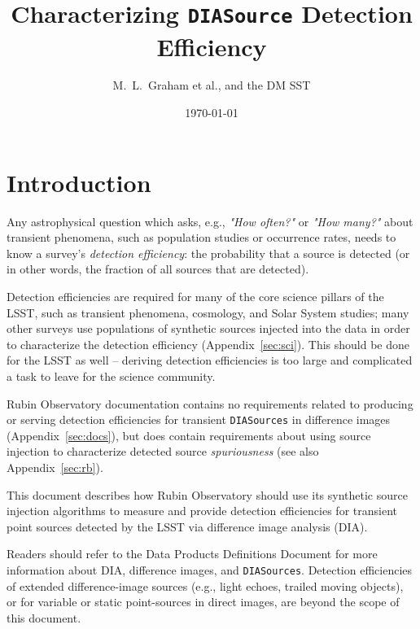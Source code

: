 \documentclass[DM,lsstdraft,toc]{lsstdoc}
\title[Detection Efficiencies]{Characterizing {\tt DIASource} Detection Efficiency}
\author{M.~L.~Graham et al., and the DM SST}
\date{\today}
\begin{document}
\maketitle



\section{Introduction} \label{sec:intro}

Any astrophysical question which asks, e.g., {\it "How often?"} or {\it "How many?"} about transient phenomena, such as population studies or occurrence rates, needs to know a survey's {\it detection efficiency}: the probability that a source is detected (or in other words, the fraction of all sources that are detected).

Detection efficiencies are required for many of the core science pillars of the LSST, such as transient phenomena, cosmology, and Solar System studies; many other surveys use populations of synthetic sources injected into the data in order to characterize the detection efficiency (Appendix~\ref{sec:sci}).
This should be done for the LSST as well -- deriving detection efficiencies is too large and complicated a task to leave for the science community.

Rubin Observatory documentation contains no requirements related to producing or serving detection efficiencies for transient {\tt DIASources} in difference images (Appendix~\ref{sec:docs}), but does contain requirements about using source injection to characterize detected source {\it spuriousness} (see also Appendix~\ref{sec:rb}).

This document describes how Rubin Observatory should use its synthetic source injection algorithms to measure and provide detection efficiencies for transient point sources detected by the LSST via difference image analysis (DIA).

Readers should refer to the Data Products Definitions Document  for more information about DIA, difference images, and {\tt DIASources}.
Detection efficiencies of extended difference-image sources (e.g., light echoes, trailed moving objects), or for variable or static point-sources in direct images, are beyond the scope of this document.
\end{document}
